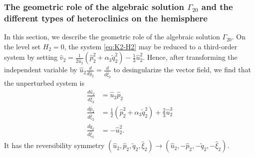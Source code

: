 \documentclass[11pt]{article}
\numberwithin{equation}{section}
\begin{document}
\subsubsection{The geometric role of the algebraic solution \texorpdfstring{$\Gamma_{20}$}{Lg} and the different types of heteroclinics on the hemisphere
}
\label{subsubsec:geomrole}

In this section, we describe the geometric role of the algebraic solution $\Gamma_{20}$. 
On the level set $H_2=0$, the system \eqref{eq:K2-H2} may be reduced to a third-order system by setting $\hat{v}_2 = \tfrac{1}{2\hat{u}_2} (\hat{p}_2^2 +\alpha_3 \tilde{q}_2^2) - \tfrac13 \hat{u}_2^2$.
Hence, after transforming the independent variable by $\hat{u}_2 \tfrac{d}{d\hat{y}_2}= \tfrac{d}{d\hat{\xi}_2}$ to desingularize the vector field, we find that the unperturbed system is 
\begin{equation}\label{eq:systemonH2zero}
    \begin{split}
        \frac{d\hat{u}_2}{d\hat{\xi}_2} &= \hat{u}_2 \hat{p}_2 \\
        \frac{d\hat{p}_2}{d\hat{\xi}_2} &= \tfrac12 (\hat{p}_2^2 + \alpha_3 \tilde{q}_2^2) + \tfrac23 \hat{u}_2^3 \\
        \frac{d\tilde{q}_2}{d\hat{\xi}_2} &= - \hat{u}_2^2.
    \end{split}
\end{equation}
%
It has the reversibility symmetry $(\hat{u}_2,\hat{p}_2, \tilde{q}_2,\hat{\xi}_2) \to (\hat{u}_2, -\hat{p}_2, -\tilde{q}_2, -\hat{\xi}_2)$.
\end{document}
